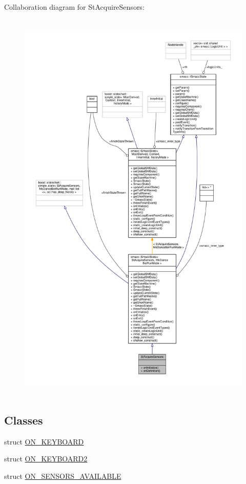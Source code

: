 Collaboration diagram for St\+Acquire\+Sensors\+:
\nopagebreak
\begin{figure}[H]
\begin{center}
\leavevmode
\includegraphics[height=550pt]{structStAcquireSensors__coll__graph}
\end{center}
\end{figure}
\subsection*{Classes}
\begin{DoxyCompactItemize}
\item 
struct \hyperlink{structStAcquireSensors_1_1ON__KEYBOARD}{O\+N\+\_\+\+K\+E\+Y\+B\+O\+A\+RD}
\item 
struct \hyperlink{structStAcquireSensors_1_1ON__KEYBOARD2}{O\+N\+\_\+\+K\+E\+Y\+B\+O\+A\+R\+D2}
\item 
struct \hyperlink{structStAcquireSensors_1_1ON__SENSORS__AVAILABLE}{O\+N\+\_\+\+S\+E\+N\+S\+O\+R\+S\+\_\+\+A\+V\+A\+I\+L\+A\+B\+LE}
\end{DoxyCompactItemize}
